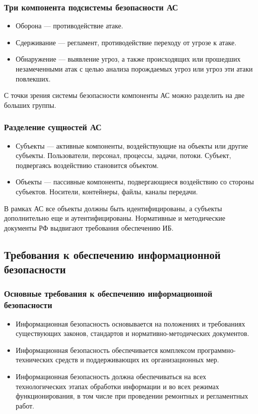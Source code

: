 \begin{frame}
\frametitle{Три компонента подсистемы безопасности АС}
\begin{itemize}
    \item Оборона --- противодействие атаке.
    \item Сдерживание --- регламент, противодействие переходу от угрозе к атаке.
    \item Обнаружение --- выявление угроз, а также происходящих или прошедших незамеченными атак с целью анализа порождаемых угроз или угроз эти атаки повлекших.
\end{itemize}
\end{frame}

С точки зрения системы безопасности компоненты АС можно разделить на две больших группы.

\begin{frame}
\frametitle{Разделение сущностей АС}
\begin{itemize}
    \item Субъекты --- активные компоненты, воздействующие на объекты или другие субъекты. Пользователи, персонал, процессы, задачи, потоки. Субъект, подвергаясь воздействию становится объектом.
    \item Объекты --- пассивные компоненты, подвергающиеся воздействию со стороны субъектов. Носители, контейнеры, файлы, каналы передачи.
\end{itemize}
\end{frame}

В рамках АС все объекты должны быть идентифицированы, а субъекты дополнительно еще и аутентифицированы.
Нормативные и методические документы РФ выдвигают требования обеспечению ИБ.

\subsection[Требования к обеспечению ИБ]{Требования к обеспечению информационной безопасности}

\begin{frame}
\frametitle{Основные требования к обеспечению информационной безопасности}
\begin{itemize}
\item Информационная безопасность основывается на положениях и  требованиях существующих законов, стандартов и нормативно-методических документов.
\item Информационная безопасность обеспечивается комплексом программно-технических средств и поддерживающих их организационных мер.
\item Информационная безопасность должна обеспечиваться на всех технологических этапах обработки информации и во всех режимах функционирования, в том числе при проведении ремонтных и регламентных работ.
\end{itemize}
\end{frame}


